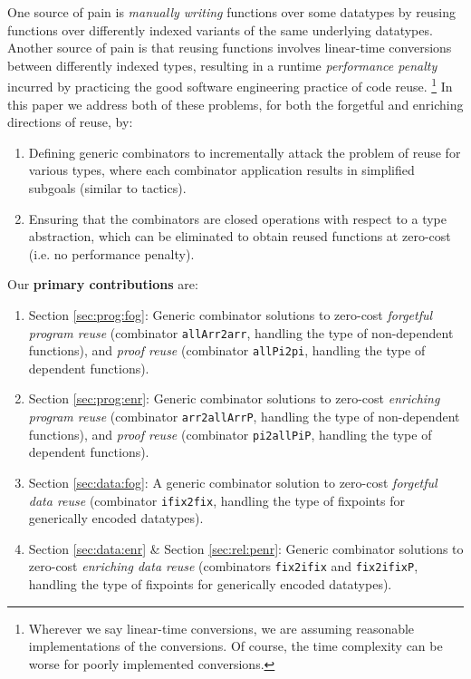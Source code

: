 \documentclass[acmsmall,screen]{acmart}
\newcommand{\refsec}[1]{Section \ref{sec:#1}}
\begin{document}
One source of pain is \textit{manually writing} functions
over some datatypes by reusing functions over differently indexed
variants of the same underlying datatypes. Another source of pain is
that reusing functions involves linear-time conversions
between differently indexed types, resulting in a
runtime \textit{performance penalty} incurred by practicing the good software
engineering practice of code reuse. \footnote{
  Wherever we say linear-time conversions, we are assuming reasonable
  implementations of the conversions. Of course, the time complexity
  can be worse for poorly implemented conversions.
}
In this paper we address both of
these problems, for both the forgetful and enriching directions of
reuse, by:
\begin{enumerate}
\item Defining generic combinators to incrementally attack the problem
  of reuse for various types, where each combinator application
  results in simplified subgoals (similar to tactics).
\item Ensuring that the combinators are closed operations with respect to
  a type abstraction, which can be eliminated to obtain reused
  functions at zero-cost (i.e. no performance penalty).
\end{enumerate}
Our \textbf{primary contributions} are:
\begin{enumerate}
\item{\refsec{prog:fog}:} Generic combinator solutions to zero-cost
  \textit{forgetful program reuse}
  (combinator \verb;allArr2arr;, handling the type of non-dependent functions),
  and \textit{proof reuse} (combinator \verb;allPi2pi;,
  handling the type of dependent functions).
\item{\refsec{prog:enr}:} Generic combinator solutions to zero-cost
  \textit{enriching program reuse}
  (combinator \verb;arr2allArrP;, handling the type of non-dependent functions),
  and \textit{proof reuse} (combinator \verb;pi2allPiP;,
  handling the type of dependent functions).
\item{\refsec{data:fog}:} A generic combinator solution to zero-cost
  \textit{forgetful data reuse}
  (combinator \verb;ifix2fix;, handling the type of fixpoints for
  generically encoded datatypes).
\item{\refsec{data:enr} \& \refsec{rel:penr}:} Generic combinator solutions to zero-cost
  \textit{enriching data reuse}
  (combinators \verb;fix2ifix; and \verb;fix2ifixP;, handling the type of fixpoints for
  generically encoded datatypes).
\end{enumerate}
\end{document}
